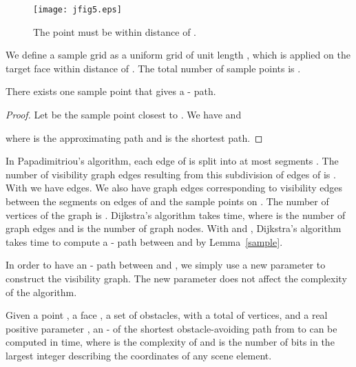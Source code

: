 \documentclass{llncs}
\begin{document}
\begin{figure}\begin{center}
    \leavevmode
\texttt{[image: jfig5.eps]}
    \caption{The point  must be within  distance of .}
    \label{jfig5}
    \end{center}
\end{figure}

We define a sample grid as a
uniform grid of unit length , which is applied on the target face  within distance  of . The total number
of sample points is .

\begin{lemma}
\label{sample}
There exists one sample point  that gives a - path.
\end{lemma}

\noindent \begin{proof}
Let  be the sample point closest to . We have  and

where  is the approximating path and  is the shortest path.
\hfill 
\end{proof}

In Papadimitriou's algorithm, each edge of  is split into at most
 segments \cite{Pap85}.
The number of visibility graph edges resulting from this subdivision of edges of  is
. With  we have
 edges. We also have
 graph edges corresponding to visibility edges between
the segments on edges of  and the sample points on .
The number of vertices of the graph is . Dijkstra's algorithm takes
 time, where  is the number of graph edges and  is the number of graph nodes. With  and , Dijkstra's algorithm takes  time to compute a - path between  and  by Lemma~\ref{sample}.

In order to have an - path between  and , we simply use a new parameter  to construct the visibility graph. The new parameter does not affect the complexity of the algorithm.

\begin{theorem}
Given a point , a face , a set  of obstacles, with a total of  vertices, and a real positive parameter , an - of
the shortest obstacle-avoiding path from  to  can be computed in
 time,
where  is the complexity of  and  is the number of bits in the largest integer describing the coordinates of any scene element.
\end{theorem}
\end{document}
